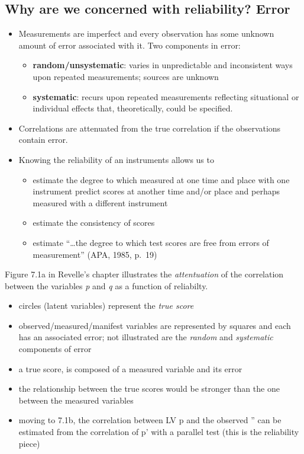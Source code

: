 \documentclass[
  english,
]{book}
\providecommand{\tightlist}{%
  \setlength{\itemsep}{0pt}\setlength{\parskip}{0pt}}
\begin{document}
\hypertarget{why-are-we-concerned-with-reliability-error}{%
\subsection{Why are we concerned with reliability? Error}\label{why-are-we-concerned-with-reliability-error}}

\begin{itemize}
\tightlist
\item
  Measurements are imperfect and every observation has some unknown amount of error associated with it. Two components in error:

  \begin{itemize}
  \tightlist
  \item
    \textbf{random/unsystematic}: varies in unpredictable and inconsistent ways upon repeated measurements; sources are unknown
  \item
    \textbf{systematic}: recurs upon repeated measurements reflecting situational or individual effects that, theoretically, could be specified.
  \end{itemize}
\item
  Correlations are attenuated from the true correlation if the observations contain error.
\item
  Knowing the reliability of an instruments allows us to

  \begin{itemize}
  \tightlist
  \item
    estimate the degree to which measured at one time and place with one instrument predict scores at another time and/or place and perhaps measured with a different instrument
  \item
    estimate the consistency of scores
  \item
    estimate ``\ldots the degree to which test scores are free from errors of measurement'' (APA, 1985, p.~19)
  \end{itemize}
\end{itemize}

Figure 7.1a in Revelle's chapter illustrates the \emph{attentuation} of the correlation between the variables \emph{p} and \emph{q} as a function of reliabilty.

\begin{itemize}
\tightlist
\item
  circles (latent variables) represent the \emph{true score}
\item
  observed/measured/manifest variables are represented by squares and each has an associated error; not illustrated are the \emph{random} and \emph{systematic} components of error
\item
  a true score, is composed of a measured variable and its error
\item
  the relationship between the true scores would be stronger than the one between the measured variables
\item
  moving to 7.1b, the correlation between LV p and the observed '' can be estimated from the correlation of p' with a parallel test (this is the reliability piece)
\end{itemize}
\end{document}
